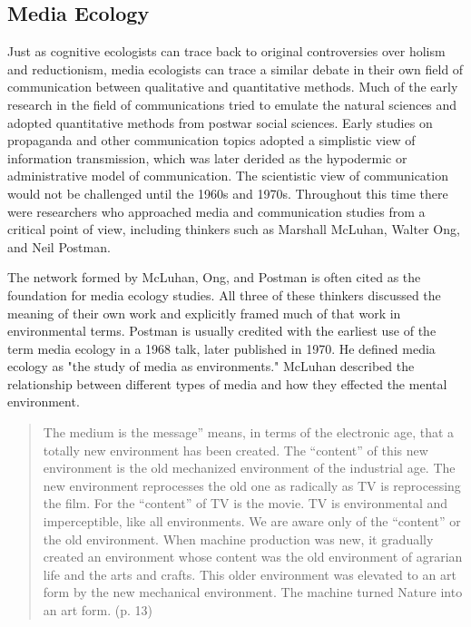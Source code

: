 \subsection{Media Ecology}

Just as cognitive ecologists can trace back to original controversies over holism and reductionism, media ecologists can trace a similar debate in their own field of communication between qualitative and quantitative methods. Much of the early research in the field of communications tried to emulate the natural sciences and adopted quantitative methods from postwar social sciences. Early studies on propaganda and other communication topics adopted a simplistic view of information transmission, which was later derided as the hypodermic or administrative model of communication. The scientistic view of communication would not be challenged until the 1960s and 1970s. Throughout this time there were researchers who approached media and communication studies from a critical point of view, including thinkers such as Marshall McLuhan, Walter Ong, and Neil Postman.

The network formed by McLuhan, Ong, and Postman is often cited as the foundation for media ecology studies. All three of these thinkers discussed the meaning of their own work and explicitly framed much of that work in environmental terms. Postman is usually credited with the earliest use of the term media ecology in a 1968 talk, later published in 1970. He defined media ecology as "the study of media as environments." \citep{strate_media_2004} McLuhan described the relationship between different types of media and how they effected the mental environment.

\begin{quote}
The medium is the message” means, in terms of the electronic age, that a totally new environment has been created. The “content” of this new environment is the old mechanized environment of the industrial age. The new environment
reprocesses the old one as radically as TV  is reprocessing the film. For the “content” of TV is the movie. TV is environmental and imperceptible, like all environments. We are aware only of the “content” or the old environment. When machine production was new, it gradually created an environment whose content was the old environment of agrarian life and the arts and crafts. This older environment was elevated to an art form by the new mechanical environment. The machine turned Nature into an art form.\citep{mcluhan_understanding_2013} (p. 13)
\end{quote}

